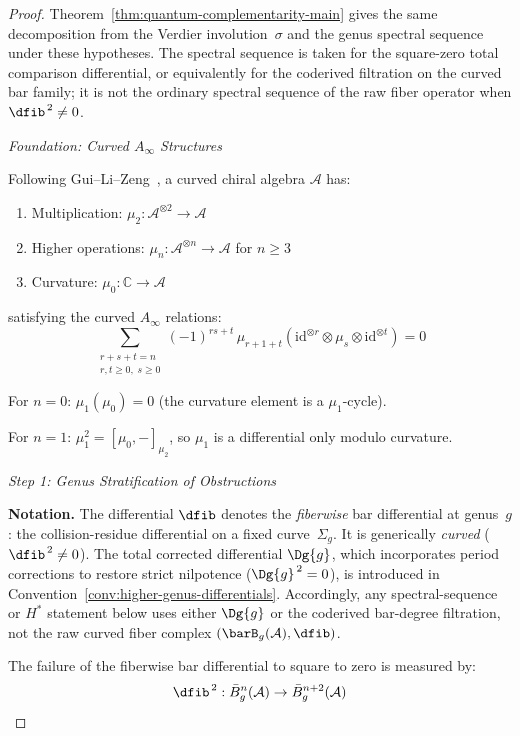 \begin{proof}
Theorem~\ref{thm:quantum-complementarity-main} gives the same
decomposition from the Verdier involution~$\sigma$ and the genus
spectral sequence under these hypotheses. The spectral sequence is
taken for the square-zero total comparison differential, or equivalently
for the coderived filtration on the curved bar family; it is not the
ordinary spectral sequence of the raw fiber operator when
$\dfib^{\,2} \neq 0$.

\emph{Foundation: Curved $A_\infty$ Structures}

Following Gui--Li--Zeng~\cite{GLZ22}, a curved chiral algebra $\mathcal{A}$ has:
\begin{enumerate}
\item Multiplication: $\mu_2: \mathcal{A}^{\otimes 2} \to \mathcal{A}$
\item Higher operations: $\mu_n: \mathcal{A}^{\otimes n} \to \mathcal{A}$ for $n \geq 3$
\item Curvature: $\mu_0: \mathbb{C} \to \mathcal{A}$
\end{enumerate}
satisfying the curved $A_\infty$ relations:
\[\sum_{\substack{r+s+t=n \\ r,t \geq 0,\; s \geq 0}} (-1)^{rs+t}\, \mu_{r+1+t}(\mathrm{id}^{\otimes r} \otimes \mu_s \otimes \mathrm{id}^{\otimes t}) = 0\]

For $n=0$: $\mu_1(\mu_0) = 0$ (the curvature element is a $\mu_1$-cycle).

For $n=1$: $\mu_1^2 = [\mu_0, -]_{\mu_2}$, so $\mu_1$ is a differential only modulo curvature.

\emph{Step 1: Genus Stratification of Obstructions}

\noindent
\textbf{Notation.}
The differential $\dfib$ denotes the \emph{fiberwise} bar differential at
genus~$g$: the collision-residue differential on a fixed curve~$\Sigma_g$.
It is generically \emph{curved} ($\dfib^{\,2} \neq 0$).
The total corrected differential $\Dg{g}$, which incorporates period
corrections to restore strict nilpotence ($\Dg{g}^{\,2} = 0$), is
introduced in Convention~\ref{conv:higher-genus-differentials}.
Accordingly, any spectral-sequence or $H^*$ statement below uses either
$\Dg{g}$ or the coderived bar-degree filtration, not the raw curved
fiber complex $(\barB_g(\mathcal{A}), \dfib)$.

\medskip

The failure of the fiberwise bar differential to square to zero is measured by:
\[\dfib^{\,2}: \bar{B}^n_g(\mathcal{A}) \to \bar{B}^{n+2}_g(\mathcal{A})\]


\end{proof}
